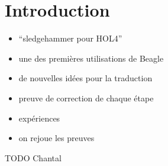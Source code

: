 \section{Introduction}

\begin{itemize}
\item ``sledgehammer pour HOL4''
\item une des premières utilisations de Beagle
\item de nouvelles idées pour la traduction
\item preuve de correction de chaque étape
\item expériences
\item on rejoue les preuves
\end{itemize}

TODO Chantal
